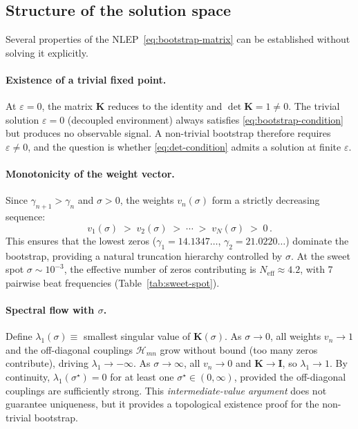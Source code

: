 \documentclass[12pt,a4paper]{article}
\begin{document}
\subsection{Structure of the solution space}
\label{subsec:solution-space}

Several properties of the NLEP~\eqref{eq:bootstrap-matrix} can be
established without solving it explicitly.

\paragraph{Existence of a trivial fixed point.}
At $\varepsilon = 0$, the matrix $\mathbf{K}$ reduces to the identity
and $\det\mathbf{K} = 1 \neq 0$.
The trivial solution $\varepsilon = 0$ (decoupled environment)
always satisfies \eqref{eq:bootstrap-condition} but produces no
observable signal.
A non-trivial bootstrap therefore requires $\varepsilon \neq 0$,
and the question is whether \eqref{eq:det-condition} admits a
solution at finite $\varepsilon$.

\paragraph{Monotonicity of the weight vector.}
Since $\gamma_{n+1} > \gamma_{n}$ and $\sigma > 0$, the weights
$v_{n}(\sigma)$ form a strictly decreasing sequence:
%
\begin{equation}
  v_{1}(\sigma) \;>\; v_{2}(\sigma) \;>\; \cdots \;>\; v_{N}(\sigma)
  \;>\; 0\,.
  \label{eq:v-monotone}
\end{equation}
%
This ensures that the lowest zeros ($\gamma_{1} = 14.1347\ldots$,
$\gamma_{2} = 21.0220\ldots$) dominate the bootstrap,
providing a natural truncation hierarchy controlled by $\sigma$.
At the sweet spot $\sigma \sim 10^{-3}$, the effective number of
zeros contributing is $N_{\mathrm{eff}} \approx 4.2$,
with 7 pairwise beat frequencies (Table~\ref{tab:sweet-spot}).

\paragraph{Spectral flow with $\sigma$.}
Define $\lambda_{1}(\sigma) \equiv$ smallest singular value of
$\mathbf{K}(\sigma)$.
As $\sigma \to 0$, all weights $v_{n} \to 1$ and the off-diagonal
couplings $\mathcal{H}_{mn}$ grow without bound (too many zeros
contribute), driving $\lambda_{1} \to -\infty$.
As $\sigma \to \infty$, all $v_{n} \to 0$ and
$\mathbf{K} \to \mathbf{I}$, so $\lambda_{1} \to 1$.
By continuity, $\lambda_{1}(\sigma^{\star}) = 0$ for at least one
$\sigma^{\star} \in (0,\infty)$, provided the off-diagonal couplings
are sufficiently strong.
This \emph{intermediate-value argument} does not guarantee uniqueness,
but it provides a topological existence proof for the non-trivial
bootstrap.
\end{document}
